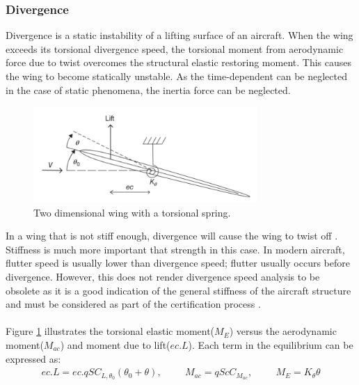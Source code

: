 \documentclass[11pt]{article}
\begin{document}
\subsubsection{Divergence}
Divergence is a static instability of a lifting surface of an aircraft. When the wing exceeds its torsional divergence speed, the torsional moment from aerodynamic force due to twist overcomes the structural elastic restoring moment. This causes the wing to become statically unstable\cite{RaymondL.Bisplinghoff2002PrinciplesAeroelasticity}. As the time-dependent can be neglected in the case of static phenomena, the inertia force can be neglected. \\
\begin{figure}
    \includegraphics[width=8.5cm]{figures/two-dimensional-wing-torsional-spring.png}
    \caption{Two dimensional wing with a torsional spring.}
    \label{fig:torsional-spring}
\end{figure} 
In a wing that is not stiff enough, divergence will cause the wing to twist off \cite{2011AeroelasticityFlutter}. Stiffness is much more important that strength in this case. In modern aircraft, flutter speed is usually lower than divergence speed; flutter usually occurs before divergence. However, this does not render divergence speed analysis to be obsolete as it is a good indication of the general stiffness of the aircraft structure and must be considered as part of the certification process \cite{Wright2015INTRODUCTIONLOADS}.\\ \\

Figure \ref{fig:torsional-spring} illustrates the torsional elastic moment($M_E$) versus the aerodynamic moment($M_{ac}$) and moment due to lift($ec.L$). Each term in the equilibrium can be expressed as:
\begin{eqnarray*}
ec.L = ec.qSC_{L,{\theta _0}}(\theta _0 + \theta),\hspace{1cm} M_{ac} = qScC_{M_{ac}},\hspace{1cm} M_E = K_{\theta}\theta
\end{eqnarray*}
\end{document}
